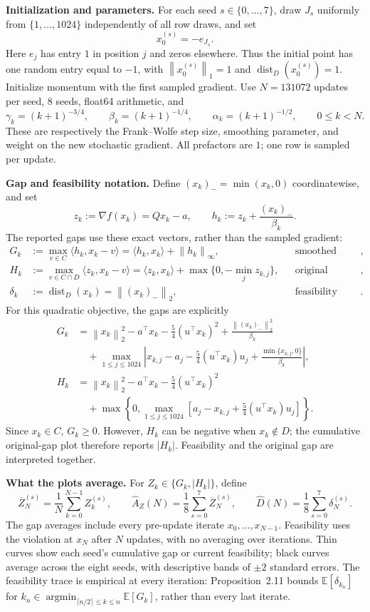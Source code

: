 \documentclass[10pt,a4paper]{article}
\newcommand{\E}{\mathbb E}
\newcommand{\ip}[2]{\langle #1,#2\rangle}
\newcommand{\norm}[1]{\left\|#1\right\|}
\DeclareMathOperator{\dist}{dist}
\begin{document}
\textbf{Initialization and parameters.} For each seed $s\in\{0,\ldots,7\}$, draw
$J_s$ uniformly from $\{1,\ldots,1024\}$ independently of all row draws, and set
\[
\boxed{x_0^{(s)}=-e_{J_s}.}
\]
Here $e_j$ has entry $1$ in position $j$ and zeros elsewhere. Thus the initial point
has one random entry equal to $-1$, with $\norm{x_0^{(s)}}_1=1$ and
$\dist_D(x_0^{(s)})=1$. Initialize momentum with the first sampled gradient.
Use $N=131072$ updates per seed, $8$ seeds, float64 arithmetic, and
\[
\boxed{\gamma_k=(k+1)^{-3/4},\qquad
\beta_k=(k+1)^{-1/4},\qquad
\alpha_k=(k+1)^{-1/2},\qquad 0\le k<N.}
\]
These are respectively the Frank--Wolfe step size, smoothing parameter, and weight
on the new stochastic gradient. All prefactors are $1$; one row is sampled per update.

\newpage
\textbf{Gap and feasibility notation.} Define $(x_k)_-=\min(x_k,0)$ coordinatewise,
and set
\[
z_k:=\nabla f(x_k)=Qx_k-a,\qquad h_k:=z_k+\frac{(x_k)_-}{\beta_k}.
\]
The reported gaps use these exact vectors, rather than the sampled gradient:
\begin{align*}
G_k
&:=\max_{v\in C}\ip{h_k}{x_k-v}
 =\boxed{\ip{h_k}{x_k}+\norm{h_k}_\infty},
&&\text{smoothed Frank--Wolfe gap},\\[3pt]
H_k
&:=\max_{v\in C\cap D}\ip{z_k}{x_k-v}
 =\boxed{\ip{z_k}{x_k}+\max\{0,-\min_jz_{k,j}\}},
&&\text{original constrained gap},\\[3pt]
\delta_k
&:=\dist_D(x_k)
 =\boxed{\norm{(x_k)_-}_2},
&&\text{feasibility violation}.
\end{align*}
For this quadratic objective, the gaps are explicitly
\[
\boxed{\begin{aligned}
G_k
&=\norm{x_k}_2^2-a^\top x_k-\frac54(u^\top x_k)^2
   +\frac{\norm{(x_k)_-}_2^2}{\beta_k}\\
&\quad+\max_{1\le j\le1024}\left|
 x_{k,j}-a_j-\frac54(u^\top x_k)u_j
 +\frac{\min\{x_{k,j},0\}}{\beta_k}\right|,\\[4pt]
H_k
&=\norm{x_k}_2^2-a^\top x_k-\frac54(u^\top x_k)^2\\
&\quad+\max\left\{0,\max_{1\le j\le1024}
 \left[a_j-x_{k,j}+\frac54(u^\top x_k)u_j\right]\right\}.
\end{aligned}}
\]
Since $x_k\in C$, $G_k\ge0$. However, $H_k$ can be negative when $x_k\notin D$;
the cumulative original-gap plot therefore reports $|H_k|$. Feasibility and the
original gap are interpreted together.

\textbf{What the plots average.} For $Z_k\in\{G_k,|H_k|\}$, define
\[
\overline Z_N^{(s)}=\frac1N\sum_{k=0}^{N-1}Z_k^{(s)},\qquad
\widehat A_Z(N)=\frac18\sum_{s=0}^{7}\overline Z_N^{(s)},\qquad
\widehat D(N)=\frac18\sum_{s=0}^{7}\delta_N^{(s)}.
\]
The gap averages include every pre-update iterate $x_0,\ldots,x_{N-1}$.
Feasibility uses the violation at $x_N$ after $N$ updates, with no averaging over iterations.
Thin curves show each seed's cumulative gap or current feasibility; black curves
average across the eight seeds, with descriptive bands of $\pm2$ standard errors.
The feasibility trace is empirical at every iteration: Proposition~2.11 bounds
$\E[\delta_{k_n}]$ for $k_n\in\operatorname*{argmin}_{\lceil n/2\rceil\le k\le n}\E[G_k]$,
rather than every last iterate.
\end{document}
